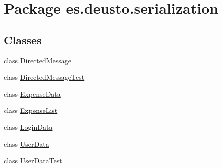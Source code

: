 \hypertarget{namespacees_1_1deusto_1_1serialization}{}\section{Package es.\+deusto.\+serialization}
\label{namespacees_1_1deusto_1_1serialization}
\subsection*{Classes}
\begin{DoxyCompactItemize}
\item 
class \hyperlink{classes_1_1deusto_1_1serialization_1_1_directed_message}{Directed\+Message}
\item 
class \hyperlink{classes_1_1deusto_1_1serialization_1_1_directed_message_test}{Directed\+Message\+Test}
\item 
class \hyperlink{classes_1_1deusto_1_1serialization_1_1_expense_data}{Expense\+Data}
\item 
class \hyperlink{classes_1_1deusto_1_1serialization_1_1_expense_list}{Expense\+List}
\item 
class \hyperlink{classes_1_1deusto_1_1serialization_1_1_login_data}{Login\+Data}
\item 
class \hyperlink{classes_1_1deusto_1_1serialization_1_1_user_data}{User\+Data}
\item 
class \hyperlink{classes_1_1deusto_1_1serialization_1_1_user_data_test}{User\+Data\+Test}
\end{DoxyCompactItemize}
